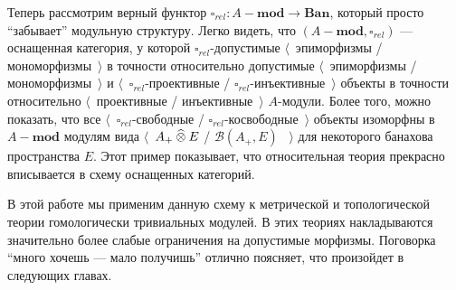 Теперь рассмотрим верный функтор $\square_{rel}:A-\mathbf{mod}\to\mathbf{Ban}$, который просто ``забывает'' модульную структуру. Легко видеть, что $(A-\mathbf{mod},\square_{rel})$ --- оснащенная категория, у которой $\square_{rel}$-допустимые $\langle$~эпиморфизмы / мономорфизмы~$\rangle$ в точности относительно допустимые $\langle$~эпиморфизмы / мономорфизмы~$\rangle$ и $\langle$~$\square_{rel}$-проективные / $\square_{rel}$-инъективные~$\rangle$ объекты в точности относительно $\langle$~проективные / инъективные~$\rangle$ $A$-модули. Более того, можно показать, что все $\langle$~$\square_{rel}$-свободные / $\square_{rel}$-косвободные~$\rangle$ объекты изоморфны в $A-\mathbf{mod}$ модулям вида $\langle$~$A_+\mathbin{\widehat{\otimes}} E$ / $\mathcal{B}(A_+,E)$ ~$\rangle$ для некоторого банахова пространства $E$. Этот пример показывает, что относительная теория прекрасно вписывается в схему оснащенных категорий.

В этой работе мы применим данную схему к метрической и топологической теории гомологически тривиальных модулей. В этих теориях накладываются значительно более слабые ограничения на допустимые морфизмы. Поговорка ``много хочешь --- мало получишь'' отлично поясняет, что произойдет в следующих главах.
